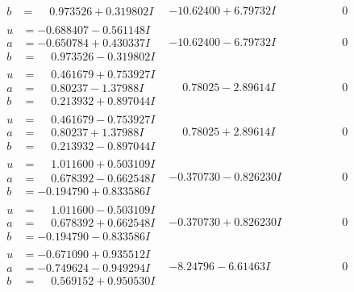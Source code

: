 \documentclass[1p]{elsarticle_modified}
\theoremstyle{definition}
\begin{document}
$$\begin{array}{c|c|c}
\begin{aligned}
b &= \phantom{-}0.973526 + 0.319802 I\end{aligned}
 & -10.62400 + 6.79732 I & \phantom{-0.000000 } 0 \\ \hline\begin{aligned}
u &= -0.688407 - 0.561148 I \\
a &= -0.650784 + 0.430337 I \\
b &= \phantom{-}0.973526 - 0.319802 I\end{aligned}
 & -10.62400 - 6.79732 I & \phantom{-0.000000 } 0 \\ \hline\begin{aligned}
u &= \phantom{-}0.461679 + 0.753927 I \\
a &= \phantom{-}0.80237 - 1.37988 I \\
b &= \phantom{-}0.213932 + 0.897044 I\end{aligned}
 & \phantom{-}0.78025 - 2.89614 I & \phantom{-0.000000 } 0 \\ \hline\begin{aligned}
u &= \phantom{-}0.461679 - 0.753927 I \\
a &= \phantom{-}0.80237 + 1.37988 I \\
b &= \phantom{-}0.213932 - 0.897044 I\end{aligned}
 & \phantom{-}0.78025 + 2.89614 I & \phantom{-0.000000 } 0 \\ \hline\begin{aligned}
u &= \phantom{-}1.011600 + 0.503109 I \\
a &= \phantom{-}0.678392 - 0.662548 I \\
b &= -0.194790 + 0.833586 I\end{aligned}
 & -0.370730 - 0.826230 I & \phantom{-0.000000 } 0 \\ \hline\begin{aligned}
u &= \phantom{-}1.011600 - 0.503109 I \\
a &= \phantom{-}0.678392 + 0.662548 I \\
b &= -0.194790 - 0.833586 I\end{aligned}
 & -0.370730 + 0.826230 I & \phantom{-0.000000 } 0 \\ \hline\begin{aligned}
u &= -0.671090 + 0.935512 I \\
a &= -0.749624 - 0.949294 I \\
b &= \phantom{-}0.569152 + 0.950530 I\end{aligned}
 & -8.24796 - 6.61463 I & \phantom{-0.000000 } 0 \\ \hline\begin{aligned}

\end{aligned}
\end{array}$$
\end{document}
